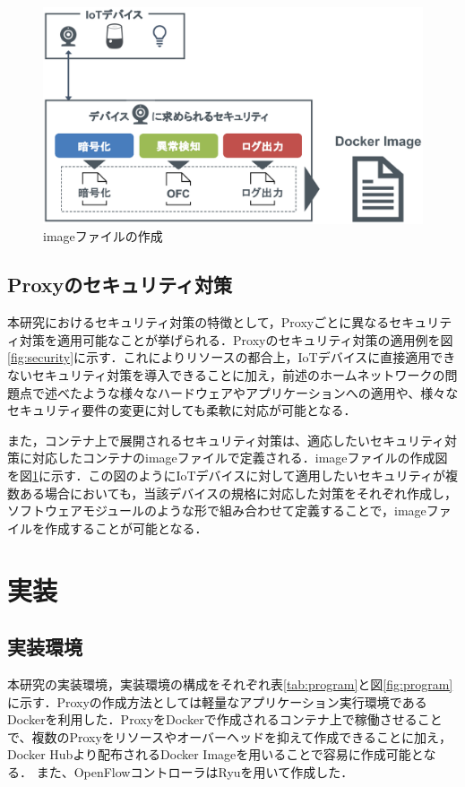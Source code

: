 \documentclass[Japanese]{dicomopapers}
\begin{document}
\begin{figure}[!tb]
	\centering
	\includegraphics[width=\linewidth]{img/dockerimage.eps}
	\caption{imageファイルの作成}
	\label{fig:dockerimage}
\end{figure}

\subsection{Proxyのセキュリティ対策}
本研究におけるセキュリティ対策の特徴として，Proxyごとに異なるセキュリティ対策を適用可能なことが挙げられる．Proxyのセキュリティ対策の適用例を図\ref{fig:security}に示す．これによりリソースの都合上，IoTデバイスに直接適用できないセキュリティ対策を導入できることに加え，前述のホームネットワークの問題点で述べたような様々なハードウェアやアプリケーションへの適用や、様々なセキュリティ要件の変更に対しても柔軟に対応が可能となる．\par
また，コンテナ上で展開されるセキュリティ対策は、適応したいセキュリティ対策に対応したコンテナのimageファイルで定義される．imageファイルの作成図を図\ref{fig:dockerimage}に示す．この図のようにIoTデバイスに対して適用したいセキュリティが複数ある場合においても，当該デバイスの規格に対応した対策をそれぞれ作成し，ソフトウェアモジュールのような形で組み合わせて定義することで，imageファイルを作成することが可能となる．

\section{実装}
\subsection{実装環境}
本研究の実装環境，実装環境の構成をそれぞれ表\ref{tab:program}と図\ref{fig:program}に示す．Proxyの作成方法としては軽量なアプリケーション実行環境であるDockerを利用した．ProxyをDockerで作成されるコンテナ上で稼働させることで、複数のProxyをリソースやオーバーヘッドを抑えて作成できることに加え，Docker Hubより配布されるDocker Imageを用いることで容易に作成可能となる．
また、OpenFlowコントローラはRyuを用いて作成した．
\end{document}
